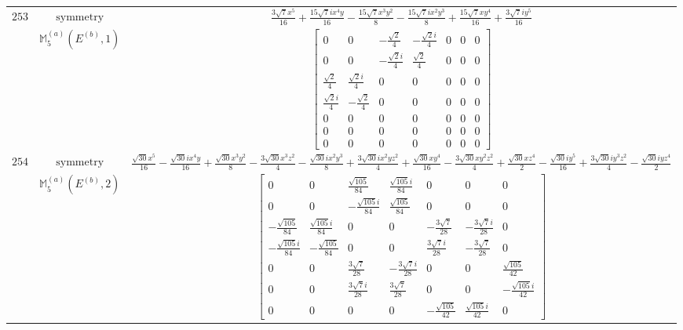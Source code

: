 \documentclass[fleqn,8pt,landscape]{jsarticle}
\begin{document}
\begin{longtable}{ccc}
$ 253 $ & $ \text{symmetry} $ & $ \frac{3 \sqrt{7} x^{5}}{16} + \frac{15 \sqrt{7} i x^{4} y}{16} - \frac{15 \sqrt{7} x^{3} y^{2}}{8} - \frac{15 \sqrt{7} i x^{2} y^{3}}{8} + \frac{15 \sqrt{7} x y^{4}}{16} + \frac{3 \sqrt{7} i y^{5}}{16} $ \\
$  $ & $ \mathbb{M}_{5}^{(a)}(E^{(b)},1) $ & $ \begin{bmatrix} 0 & 0 & - \frac{\sqrt{2}}{4} & - \frac{\sqrt{2} i}{4} & 0 & 0 & 0 \\ 0 & 0 & - \frac{\sqrt{2} i}{4} & \frac{\sqrt{2}}{4} & 0 & 0 & 0 \\ \frac{\sqrt{2}}{4} & \frac{\sqrt{2} i}{4} & 0 & 0 & 0 & 0 & 0 \\ \frac{\sqrt{2} i}{4} & - \frac{\sqrt{2}}{4} & 0 & 0 & 0 & 0 & 0 \\ 0 & 0 & 0 & 0 & 0 & 0 & 0 \\ 0 & 0 & 0 & 0 & 0 & 0 & 0 \\ 0 & 0 & 0 & 0 & 0 & 0 & 0 \end{bmatrix} $ \\ \hline
$ 254 $ & $ \text{symmetry} $ & $ \frac{\sqrt{30} x^{5}}{16} - \frac{\sqrt{30} i x^{4} y}{16} + \frac{\sqrt{30} x^{3} y^{2}}{8} - \frac{3 \sqrt{30} x^{3} z^{2}}{4} - \frac{\sqrt{30} i x^{2} y^{3}}{8} + \frac{3 \sqrt{30} i x^{2} y z^{2}}{4} + \frac{\sqrt{30} x y^{4}}{16} - \frac{3 \sqrt{30} x y^{2} z^{2}}{4} + \frac{\sqrt{30} x z^{4}}{2} - \frac{\sqrt{30} i y^{5}}{16} + \frac{3 \sqrt{30} i y^{3} z^{2}}{4} - \frac{\sqrt{30} i y z^{4}}{2} $ \\
$  $ & $ \mathbb{M}_{5}^{(a)}(E^{(b)},2) $ & $ \begin{bmatrix} 0 & 0 & \frac{\sqrt{105}}{84} & \frac{\sqrt{105} i}{84} & 0 & 0 & 0 \\ 0 & 0 & - \frac{\sqrt{105} i}{84} & \frac{\sqrt{105}}{84} & 0 & 0 & 0 \\ - \frac{\sqrt{105}}{84} & \frac{\sqrt{105} i}{84} & 0 & 0 & - \frac{3 \sqrt{7}}{28} & - \frac{3 \sqrt{7} i}{28} & 0 \\ - \frac{\sqrt{105} i}{84} & - \frac{\sqrt{105}}{84} & 0 & 0 & \frac{3 \sqrt{7} i}{28} & - \frac{3 \sqrt{7}}{28} & 0 \\ 0 & 0 & \frac{3 \sqrt{7}}{28} & - \frac{3 \sqrt{7} i}{28} & 0 & 0 & \frac{\sqrt{105}}{42} \\ 0 & 0 & \frac{3 \sqrt{7} i}{28} & \frac{3 \sqrt{7}}{28} & 0 & 0 & - \frac{\sqrt{105} i}{42} \\ 0 & 0 & 0 & 0 & - \frac{\sqrt{105}}{42} & \frac{\sqrt{105} i}{42} & 0 \end{bmatrix} $ \\ \hline

\end{longtable}
\end{document}
